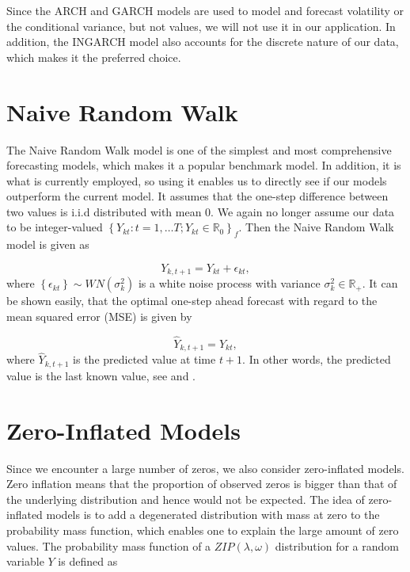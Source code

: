 Since the ARCH and GARCH models are used to model and forecast volatility or the conditional variance, but not values, we will not use it in our application. In addition, the INGARCH model also accounts for the discrete nature of our data, which makes it the preferred choice. 


\section{Naive Random Walk}
\label{sec: Naive Random Walk}

The Naive Random Walk model is one of the simplest and most comprehensive forecasting models, which makes it a popular benchmark model. In addition, it is what is currently employed, so using it enables us to directly see if our models outperform the current model. It assumes that the one-step difference between two values is i.i.d distributed with mean 0. We again no longer assume our data to be integer-valued $\left\{Y_{kt}:t=1,\ldots T; Y_{kt} \in \mathbb{R}_0\right\}_f$. Then the Naive Random Walk model is given as

\begin{equation}
Y_{k,t+1}= Y_{kt} + \epsilon_{kt}, 
\label{eq: Random Walk Model}
\end{equation}
where $\left\{\epsilon_{kt}\right\} \sim WN(\sigma_k^2)$ is a white noise process with variance $\sigma_k^2 \in \mathbb{R}_+$. It can be shown easily, that the optimal one-step ahead forecast with regard to the mean squared error (MSE) is given by

\begin{equation}
\hat{Y}_{k,t+1}= Y_{kt},
\label{eq: Random Walk Model Prediction}
\end{equation}
%
where $\hat{Y}_{k,t+1}$ is the predicted value at time $t+1$. In other words, the predicted value is the last known value, see \textcite{Nau:14} and \textcite{Scherrer:2021}.  


\section{Zero-Inflated Models}
\label{sec: Zim}

Since we encounter a large number of zeros, we also consider zero-inflated models. Zero inflation means that the proportion of observed zeros is bigger than that of the underlying distribution and hence would not be expected. The idea of zero-inflated models is to add a degenerated distribution with mass at zero to the probability mass function, which enables one to explain the large amount of zero values. The probability mass function of a $ZIP(\lambda,\omega)$ distribution for a random variable $Y$ is defined as

